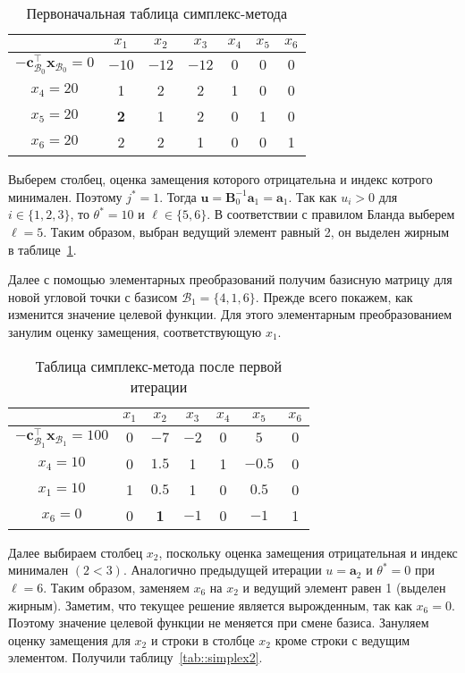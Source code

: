 \documentclass[12pt]{article}
\newcommand{\bx}{\mathbf{x}}
\begin{document}
\begin{table}[!ht]
\centering
\caption{Первоначальная таблица симплекс-метода}
\begin{tabular}{|c|cccccc|}
\hline
& $x_1$ & $x_2$ & $x_3$ & $x_4$ & $x_5$ & $x_6$\\
\hline
$-\mathbf{c}_{\mathcal{B}_0}^{\top}\bx_{\mathcal{B}_0} = 0$ & $-10$ & $-12$ & $-12$ & $0$ & $0$ & $0$ \\
\hline
$x_4 = 20$ & 1 & 2 & 2 & 1 & 0 & 0 \\
$x_5 = 20$ & \textbf{2} & 1 & 2 & 0 & 1 & 0 \\
$x_6 = 20$ & 2 & 2 & 1 & 0 & 0 & 1 \\
\hline
\end{tabular}
\label{tab::simplex0}
\end{table}
Выберем столбец, оценка замещения которого отрицательна и индекс котрого минимален.
Поэтому $j^* = 1$.
Тогда $\mathbf{u} = \mathbf{B}^{-1}_0\mathbf{a}_1 = \mathbf{a}_1.$
Так как $u_i > 0$ для $i \in \{1,2,3\}$, то $\theta^* = 10$ и $\ell \in \{5, 6\}$.
В соответствии с правилом Бланда выберем $\ell = 5$.
Таким образом, выбран ведущий элемент равный 2, он выделен жирным в таблице~\ref{tab::simplex0}.

Далее с помощью элементарных преобразований получим базисную матрицу для новой угловой точки с базисом $\mathcal{B}_1 = \{4, 1, 6\}$. 
Прежде всего покажем, как изменится значение целевой функции.
Для этого элементарным преобразованием занулим оценку замещения, соответствующую $x_1$.

\begin{table}[!ht]
\centering
\caption{Таблица симплекс-метода после первой итерации}
\begin{tabular}{|c|cccccc|}
\hline
& $x_1$ & $x_2$ & $x_3$ & $x_4$ & $x_5$ & $x_6$\\
\hline
$-\mathbf{c}_{\mathcal{B}_1}^{\top}\bx_{\mathcal{B}_1} = 100$ & $0$ & $-7$ & $-2$ & $0$ & $5$ & $0$ \\
\hline
$x_4 = 10$ & 0 & $1.5$ & 1 & 1 & $-0.5$ & 0 \\
$x_1 = 10$ & 1 & $0.5$ & 1 & 0 & $0.5$ & 0 \\
$x_6 = 0$ & 0 & \textbf{1} & $-1$ & 0 & $-1$ & 1 \\
\hline
\end{tabular}
\label{tab::simplex1}
\end{table}

Далее выбираем столбец $x_2$, поскольку оценка замещения отрицательная и индекс минимален $(2 < 3)$.
Аналогично предыдущей итерации $u = \mathbf{a}_2$ и $\theta^* = 0$ при $\ell = 6$. 
Таким образом, заменяем $x_6$ на $x_2$ и ведущий элемент равен 1 (выделен жирным). 
Заметим, что текущее решение является вырожденным, так как $x_6 = 0$. 
Поэтому значение целевой функции не меняется при смене базиса. 
Зануляем оценку замещения для $x_2$ и строки в столбце $x_2$ кроме строки с ведущим элементом. 
Получили таблицу~\ref{tab::simplex2}.
\end{document}
